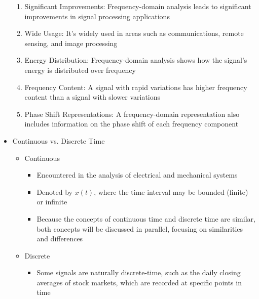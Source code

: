 \begin{itemize}
\begin{enumerate}
      \item Significant Improvements: Frequency-domain analysis leads to significant improvements in signal processing applications

      \item Wide Usage: It's widely used in areas such as communications, remote sensing, and image processing

      \item Energy Distribution: Frequency-domain analysis shows how the signal's energy is distributed over frequency

      \item Frequency Content: A signal with rapid variations has higher frequency content than a signal with slower variations

      \item Phase Shift Representations: A frequency-domain representation also includes information on the phase shift of each frequency component

    \end{enumerate}

  \item Continuous vs. Discrete Time

    \begin{itemize}

      \item Continuous

        \begin{itemize}

          \item Encountered in the analysis of electrical and mechanical systems

          \item Denoted by $x(t)$, where the time interval may be bounded (finite) or infinite

          \item Because the concepts of continuous time and discrete time are similar, both concepts will be discussed in parallel, focusing on similarities and differences

        \end{itemize}

      \item Discrete

        \begin{itemize}

          \item Some signals are naturally discrete-time, such as the daily closing averages of stock markets, which are recorded at specific points in time

        \end{itemize}

    \end{itemize}

\end{itemize}



